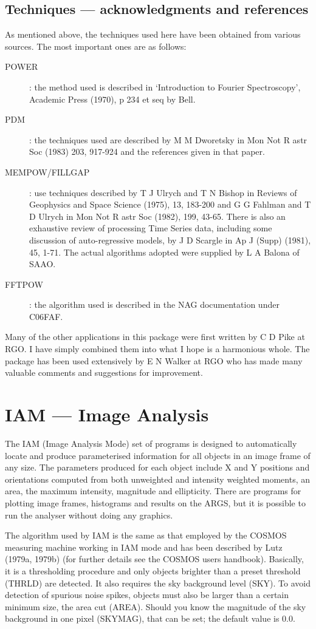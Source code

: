 \subsection {Techniques --- acknowledgments and references}
As mentioned above, the techniques used here have been obtained from various
sources. The most important ones are as follows:
\begin{description}
\item [POWER]: the method used is described in `Introduction to Fourier Spectroscopy',
Academic Press (1970), p 234 et seq by Bell.
\item [PDM]: the techniques used are described by M M Dworetsky in Mon Not R
astr Soc (1983) 203, 917-924 and the references given in that paper.
\item [MEMPOW/FILLGAP]: use techniques described by T J Ulrych and T N Bishop in
Reviews of Geophysics and Space Science (1975), 13, 183-200 and G G Fahlman and
T D Ulrych in Mon Not R astr Soc (1982), 199, 43-65.
There is also an exhaustive review of processing Time Series data, including
some discussion of auto-regressive models, by J D Scargle in Ap J (Supp) (1981),
45, 1-71.
The actual algorithms adopted were supplied by L A Balona of SAAO.
\item [FFTPOW]: the algorithm used is described in the NAG documentation under
C06FAF.
\end{description}
Many of the other applications in this package were first written by C D Pike at
RGO.
I have simply combined them into what I hope is a harmonious whole.
The package has been used extensively by E N Walker at RGO who has made many
valuable comments and suggestions for improvement.

\section {IAM --- Image Analysis}

The IAM (Image Analysis Mode) set of programs is designed to automatically
locate and produce parameterised information for all objects in an image frame
of any size.
The parameters produced for each object include X and Y positions and
orientations computed from both unweighted and intensity weighted moments, an
area, the maximum intensity, magnitude and ellipticity.
There are programs for plotting image frames, histograms and results on the
ARGS, but it is possible to run the analyser without doing any graphics.

The algorithm used by IAM is the same as that employed by the COSMOS measuring
machine working in IAM mode and has been described by Lutz (1979a, 1979b) (for
further details see the COSMOS users handbook).
Basically, it is a thresholding procedure and only objects brighter than a
preset threshold (THRLD) are detected.
It also requires the sky background level (SKY).
To avoid detection of spurious noise spikes, objects must also be larger than a
certain minimum size, the area cut (AREA).
Should you know the magnitude of the sky background in one pixel (SKYMAG), that
can be set; the default value is 0.0.

